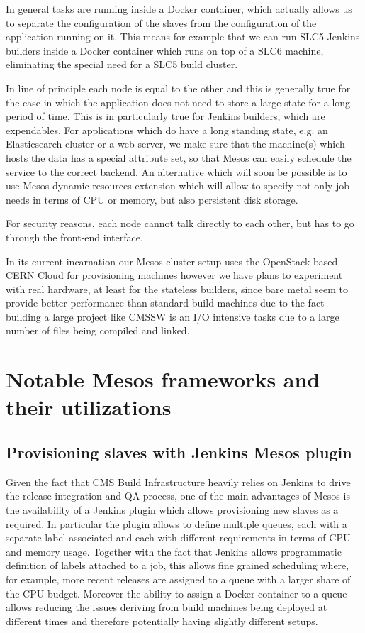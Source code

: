 \documentclass[a4paper]{jpconf}
\begin{document}
In general tasks are running inside a Docker container, which actually allows us
to separate the configuration of the slaves from the configuration of the
application running on it. This means for example that we can run SLC5 Jenkins
builders inside a Docker container which runs on top of a SLC6 machine,
eliminating the special need for a SLC5 build cluster.

In line of principle each node is equal to the other and this is generally true
for the case in which the application does not need to store a large state for a
long period of time. This is in particularly true for Jenkins builders, which
are expendables. For applications which do have a long standing state, e.g. an
Elasticsearch cluster or a web server, we make sure that the machine(s) which
hosts the data has a special attribute set, so that Mesos can easily schedule
the service to the correct backend. An alternative which will soon be possible
is to use Mesos dynamic resources extension which will allow to specify not only
job needs in terms of CPU or memory, but also persistent disk storage.

For security reasons, each node cannot talk directly to each other, but has to
go through the front-end interface.

In its current incarnation our Mesos cluster setup uses the OpenStack based CERN
Cloud for provisioning machines however we have plans to experiment with real
hardware, at least for the stateless builders, since bare metal seem to provide
better performance than standard build machines due to the fact building a large
project like CMSSW is an I/O intensive tasks due to a large number of files
being compiled and linked.

\section{Notable Mesos frameworks and their utilizations}

\subsection{Provisioning slaves with Jenkins Mesos plugin}

Given the fact that CMS Build Infrastructure heavily relies on Jenkins to drive
the release integration and QA process, one of the main advantages of Mesos is
the availability of a Jenkins plugin which allows provisioning new slaves as a
required. In particular the plugin allows to define multiple queues, each with a
separate label associated and each with different requirements in terms of CPU
and memory usage. Together with the fact that Jenkins allows programmatic
definition of labels attached to a job, this allows fine grained scheduling
where, for example, more recent releases are assigned to a queue with a larger
share of the CPU budget. Moreover the ability to assign a Docker container to a
queue allows reducing the issues deriving from build machines being deployed at
different times and therefore potentially having slightly different setups.
\end{document}

